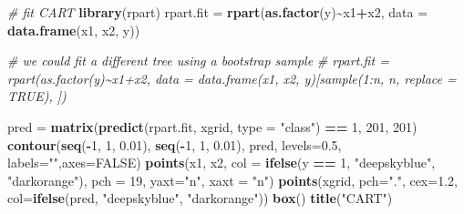 \documentclass[
]{book}
\newenvironment{Shaded}{\begin{snugshade}}{\end{snugshade}}
\newcommand{\AttributeTok}[1]{\textcolor[rgb]{0.13,0.29,0.53}{#1}}
\newcommand{\CommentTok}[1]{\textcolor[rgb]{0.56,0.35,0.01}{\textit{#1}}}
\newcommand{\ConstantTok}[1]{\textcolor[rgb]{0.56,0.35,0.01}{#1}}
\newcommand{\DecValTok}[1]{\textcolor[rgb]{0.00,0.00,0.81}{#1}}
\newcommand{\FloatTok}[1]{\textcolor[rgb]{0.00,0.00,0.81}{#1}}
\newcommand{\FunctionTok}[1]{\textcolor[rgb]{0.13,0.29,0.53}{\textbf{#1}}}
\newcommand{\NormalTok}[1]{#1}
\newcommand{\OtherTok}[1]{\textcolor[rgb]{0.56,0.35,0.01}{#1}}
\newcommand{\SpecialCharTok}[1]{\textcolor[rgb]{0.81,0.36,0.00}{\textbf{#1}}}
\newcommand{\StringTok}[1]{\textcolor[rgb]{0.31,0.60,0.02}{#1}}
\theoremstyle{definition}
\theoremstyle{definition}
\theoremstyle{definition}
\theoremstyle{definition}
\theoremstyle{remark}
\begin{document}
\begin{Shaded}
\begin{Highlighting}[]
  \CommentTok{\# fit CART}
  \FunctionTok{library}\NormalTok{(rpart)}
\NormalTok{  rpart.fit }\OtherTok{=} \FunctionTok{rpart}\NormalTok{(}\FunctionTok{as.factor}\NormalTok{(y)}\SpecialCharTok{\textasciitilde{}}\NormalTok{x1}\SpecialCharTok{+}\NormalTok{x2, }\AttributeTok{data =} \FunctionTok{data.frame}\NormalTok{(x1, x2, y))}

  \CommentTok{\# we could fit a different tree using a bootstrap sample}
  \CommentTok{\# rpart.fit = rpart(as.factor(y)\textasciitilde{}x1+x2, data = data.frame(x1, x2, y)[sample(1:n, n, replace = TRUE), ])}

\NormalTok{  pred }\OtherTok{=} \FunctionTok{matrix}\NormalTok{(}\FunctionTok{predict}\NormalTok{(rpart.fit, xgrid, }\AttributeTok{type =} \StringTok{"class"}\NormalTok{) }\SpecialCharTok{==} \DecValTok{1}\NormalTok{, }\DecValTok{201}\NormalTok{, }\DecValTok{201}\NormalTok{)}
  \FunctionTok{contour}\NormalTok{(}\FunctionTok{seq}\NormalTok{(}\SpecialCharTok{{-}}\DecValTok{1}\NormalTok{, }\DecValTok{1}\NormalTok{, }\FloatTok{0.01}\NormalTok{), }\FunctionTok{seq}\NormalTok{(}\SpecialCharTok{{-}}\DecValTok{1}\NormalTok{, }\DecValTok{1}\NormalTok{, }\FloatTok{0.01}\NormalTok{), pred, }\AttributeTok{levels=}\FloatTok{0.5}\NormalTok{, }\AttributeTok{labels=}\StringTok{""}\NormalTok{,}\AttributeTok{axes=}\ConstantTok{FALSE}\NormalTok{)}
  \FunctionTok{points}\NormalTok{(x1, x2, }\AttributeTok{col =} \FunctionTok{ifelse}\NormalTok{(y }\SpecialCharTok{==} \DecValTok{1}\NormalTok{, }\StringTok{"deepskyblue"}\NormalTok{, }\StringTok{"darkorange"}\NormalTok{), }\AttributeTok{pch =} \DecValTok{19}\NormalTok{, }\AttributeTok{yaxt=}\StringTok{"n"}\NormalTok{, }\AttributeTok{xaxt =} \StringTok{"n"}\NormalTok{)}
  \FunctionTok{points}\NormalTok{(xgrid, }\AttributeTok{pch=}\StringTok{"."}\NormalTok{, }\AttributeTok{cex=}\FloatTok{1.2}\NormalTok{, }\AttributeTok{col=}\FunctionTok{ifelse}\NormalTok{(pred, }\StringTok{"deepskyblue"}\NormalTok{, }\StringTok{"darkorange"}\NormalTok{))}
  \FunctionTok{box}\NormalTok{()    }
  \FunctionTok{title}\NormalTok{(}\StringTok{"CART"}\NormalTok{)}
 

\end{Highlighting}
\end{Shaded}
\end{document}
